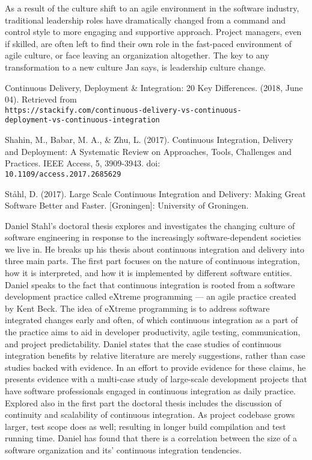 \documentclass[11pt,a4paper]{article}
\begin{document}
\begin{thebibliography}{6}
\begin{adjustwidth}{1cm}{}
		As a result of the culture shift to an agile environment in the software industry,
		traditional leadership roles have dramatically changed from a command and control
		style to more engaging and supportive approach. Project managers, even if skilled, are
		often left to find their own role in the fast-paced environment of agile culture, or face
		leaving an organization altogether. The key to any transformation to a new culture Jan
		says, is leadership culture change.
	\end{adjustwidth}
	
	Continuous Delivery, Deployment \& Integration: 20 Key Differences. (2018, June 04). Retrieved from \\\texttt{https://stackify.com/continuous-delivery-vs-continuous-\\deployment-vs-continuous-integration}
	
	 Shahin, M., Babar, M. A., \& Zhu, L. (2017). Continuous Integration, Delivery and Deployment: A Systematic Review on Approaches, Tools, Challenges and Practices. IEEE Access, 5, 3909-3943. doi:\\\texttt{10.1109/access.2017.2685629}
	
	St\aa hl, D. (2017). Large Scale Continuous Integration and Delivery: Making Great Software Better and Faster. [Groningen]: University of Groningen.
	\begin{adjustwidth}{1cm}{}
		Daniel Stahl’s doctoral thesis explores and investigates the changing culture of software
		engineering in response to the increasingly software-dependent societies we live in. He
		breaks up his thesis about continuous integration and delivery into three main parts.
		The first part focuses on the nature of continuous integration, how it is interpreted, and
		how it is implemented by different software entities. Daniel speaks to the fact that
		continuous integration is rooted from a software development practice called eXtreme
		programming — an agile practice created by Kent Beck. The idea of eXtreme
		programming is to address software integrated changes early and often, of which
		continuous integration as a part of the practice aims to aid in developer productivity,
		agile testing, communication, and project predictability. Daniel states that the case
		studies of continuous integration benefits by relative literature are merely suggestions,
		rather than case studies backed with evidence. In an effort to provide evidence for
		these claims, he presents evidence with a multi-case study of large-scale development
		projects that have software professionals engaged in continuous integration as daily
		practice. Explored also in the first part the doctoral thesis includes the discussion of
		continuity and scalability of continuous integration. As project codebase grows larger,
		test scope does as well; resulting in longer build compilation and test running time.
		Daniel has found that there is a correlation between the size of a software organization
		and its’ continuous integration tendencies.


\end{adjustwidth}
\end{thebibliography}
\end{document}
